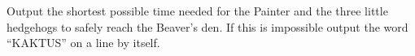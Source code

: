 Output the shortest possible time needed for the Painter and the three little hedgehogs to safely reach the Beaver's den. If this is impossible output the word “KAKTUS” on a line by itself.